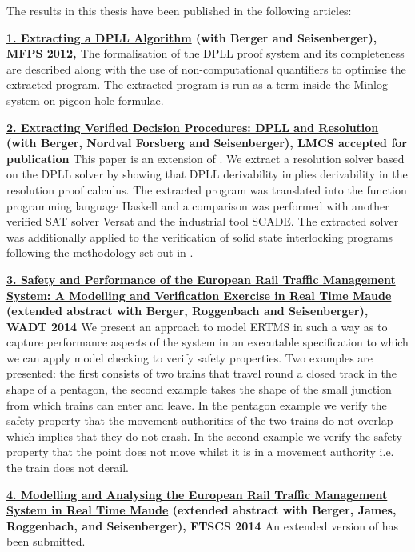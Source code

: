 The results in this thesis have been published in the following articles:

\textbf{\ul{1. Extracting a DPLL Algorithm} (with Berger and Seisenberger), MFPS 2012, \cite{AL12}}
The formalisation of the DPLL proof system and its completeness are described along with the use of non-computational quantifiers to optimise the extracted program. The extracted program is run as a term inside the Minlog system on pigeon hole formulae.


\textbf{\ul{2. Extracting Verified Decision Procedures: DPLL and Resolution} (with Berger, Nordval Forsberg and Seisenberger), LMCS accepted for publication \cite{AL14b}}
This paper is an extension of \cite{AL12}. We extract a resolution solver based on the DPLL solver by showing that DPLL derivability implies derivability in the resolution proof calculus. The extracted program was translated into the function programming language Haskell and a comparison was performed with another verified SAT solver Versat and the industrial tool SCADE. The extracted solver was additionally applied to the verification of solid state interlocking programs following the methodology set out in \cite{AL14a}.



\textbf{\ul{3. Safety and Performance of the European Rail Traffic Management System: A Modelling and Verification Exercise in Real Time Maude} (extended abstract with Berger, Roggenbach and Seisenberger), WADT 2014 \cite{AL14c}} We present an approach to model ERTMS in such a way as to capture performance aspects of the system in an executable specification to which we can apply model checking to verify safety properties. Two examples are presented: the first consists of two trains that travel round a closed track in the shape of a pentagon, the second example takes the shape of the small junction from which trains can enter and leave. In the pentagon example we verify the safety property that the movement authorities of the two trains do not overlap which implies that they do not crash. In the second example we verify the safety property that the point does not move whilst it is in a movement authority i.e. the train does not derail.

\textbf{\ul{4. Modelling and Analysing the European Rail Traffic Management System in Real Time Maude} (extended abstract with Berger, James, Roggenbach, and Seisenberger), FTSCS 2014 \cite{AL14d}} An extended version of \cite{AL14c} has been submitted.



